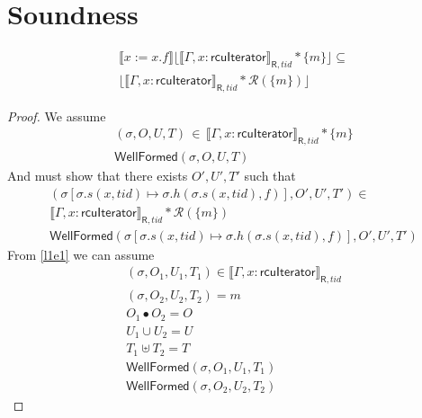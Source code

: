 \section{Soundness}
\label{sec:lemmas}

\begin{Lemma}
\begin{gather}
\llbracket x:=x.f \rrbracket \lfloor \llbracket \Gamma,x:\mathsf{rcuIterator} \rrbracket_{\textsf{R},tid} * \{m\}\rfloor  \subseteq \\ 
\lfloor \llbracket \Gamma,x:\mathsf{rcuIterator} \rrbracket_{\textsf{R},tid}  * \mathcal{R}(\{m\})\rfloor 
\end{gather}
\end{Lemma}
\begin{proof}
We assume 
\begin{gather} \label{l1e1}
(\sigma,O,U,T) \, \in \, \llbracket \Gamma,x:\textsf{rcuIterator} \rrbracket_{\textsf{R},tid} * \{m\}
\\
\label{l1ewfa}
\textsf{WellFormed}(\sigma,O,U,T)
\end{gather}
And must show that there exists $O',U',T'$ such that
\begin{gather} \label{l1e3}
(\sigma[ \sigma.s(x,tid) \mapsto \sigma.h(\sigma.s(x,tid),f) ], O',U',T') \in \\
\llbracket \Gamma,x:\textsf{rcuIterator} \rrbracket_{\textsf{R},tid} * \mathcal{R}(\{m\})
\\
\label{l1ewfa}
\textsf{WellFormed}(\sigma[ \sigma.s(x,tid) \mapsto \sigma.h(\sigma.s(x,tid),f)  ],O',U',T')
\end{gather}
%
From \ref{l1e1} we can assume
%
\begin{gather} \label{l1e4}
(\sigma,O_{1},U_{1},T_{1}) \in \llbracket \Gamma, x:\textsf{rcuIterator} \rrbracket_{\textsf{R},tid}
\\
 \label{l1e5}
(\sigma,O_{2},U_{2},T_{2}) = m 
\\
 \label{l1e6}
O_{1} \bullet O_{2} = O
\\
 \label{l1e7}
U_{1} \cup U_{2} = U 
\\
 \label{l1e8}
T_{1} \uplus T_{2} = T
\\
\label{l1wfa1}
\textsf{WellFormed}(\sigma,O_{1},U_{1},T_{1})
\\
\label{l1wfa2}
\textsf{WellFormed}(\sigma,O_{2},U_{2},T_{2})

\end{gather}
\end{proof}
